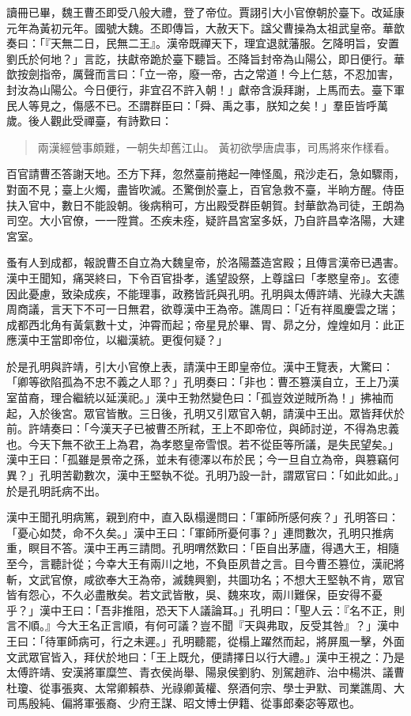 讀冊已畢，魏王曹丕即受八般大禮，登了帝位。賈詡引大小官僚朝於臺下。改延康元年為黃初元年。國號大魏。丕即傳旨，大赦天下。諡父曹操為太祖武皇帝。華歆奏曰：「『天無二日，民無二王』。漢帝既禪天下，理宜退就藩服。乞降明旨，安置劉氏於何地？」言訖，扶獻帝跪於臺下聽旨。丕降旨封帝為山陽公，即日便行。華歆按劍指帝，厲聲而言曰：「立一帝，廢一帝，古之常道！今上仁慈，不忍加害，封汝為山陽公。今日便行，非宜召不許入朝！」獻帝含淚拜謝，上馬而去。臺下軍民人等見之，傷感不已。丕謂群臣曰：「舜、禹之事，朕知之矣！」羣臣皆呼萬歲。後人觀此受禪臺，有詩歎曰：

\begin{quote}
兩漢經營事頗難，一朝失却舊江山。
黃初欲學唐虞事，司馬將來作樣看。
\end{quote}

百官請曹丕答謝天地。丕方下拜，忽然臺前捲起一陣怪風，飛沙走石，急如驟雨，對面不見；臺上火燭，盡皆吹滅。丕驚倒於臺上，百官急救不臺，半晌方醒。侍臣扶入官中，數日不能設朝。後病稍可，方出殿受群臣朝賀。封華歆為司徒，王朗為司空。大小官僚，一一陞賞。丕疾未痊，疑許昌宮室多妖，乃自許昌幸洛陽，大建宮室。

蚤有人到成都，報說曹丕自立為大魏皇帝，於洛陽蓋造宮殿；且傳言漢帝已遇害。漢中王聞知，痛哭終曰，下令百官掛孝，遙望設祭，上尊諡曰「孝愍皇帝」。玄德因此憂慮，致染成疾，不能理事，政務皆託與孔明。孔明與太傅許靖、光祿大夫譙周商議，言天下不可一日無君，欲尊漢中王為帝。譙周曰：「近有祥風慶雲之瑞；成都西北角有黃氣數十丈，沖霄而起；帝星見於畢、胃、昴之分，煌煌如月：此正應漢中王當即帝位，以繼漢統。更復何疑？」

於是孔明與許靖，引大小官僚上表，請漢中王即皇帝位。漢中王覽表，大驚曰：「卿等欲陷孤為不忠不義之人耶？」孔明奏曰：「非也：曹丕篡漢自立，王上乃漢室苗裔，理合繼統以延漢祀。」漢中王勃然變色曰：「孤豈效逆賊所為！」拂袖而起，入於後宮。眾官皆散。三日後，孔明又引眾官入朝，請漢中王出。眾皆拜伏於前。許靖奏曰：「今漢天子已被曹丕所弒，王上不即帝位，與師討逆，不得為忠義也。今天下無不欲王上為君，為孝愍皇帝雪恨。若不從臣等所議，是失民望矣。」漢中王曰：「孤雖是景帝之孫，並未有德澤以布於民；今一旦自立為帝，與篡竊何異？」孔明苦勸數次，漢中王堅執不從。孔明乃設一計，謂眾官曰：「如此如此。」於是孔明託病不出。

漢中王聞孔明病篤，親到府中，直入臥榻邊問曰：「軍師所感何疾？」孔明答曰：「憂心如焚，命不久矣。」漢中王曰：「軍師所憂何事？」連問數次，孔明只推病重，瞑目不答。漢中王再三請問。孔明喟然歎曰：「臣自出茅廬，得遇大王，相隨至今，言聽計從；今幸大王有兩川之地，不負臣夙昔之言。目今曹丕篡位，漢祀將斬，文武官僚，咸欲奉大王為帝，滅魏興劉，共圖功名；不想大王堅執不肯，眾官皆有怨心，不久必盡散矣。若文武皆散，吳、魏來攻，兩川難保，臣安得不憂乎？」漢中王曰：「吾非推阻，恐天下人議論耳。」孔明曰：「聖人云：『名不正，則言不順。』今大王名正言順，有何可議？豈不聞『天與弗取，反受其咎』？」漢中王曰：「待軍師病可，行之未遲。」孔明聽罷，從榻上躍然而起，將屏風一擊，外面文武眾官皆入，拜伏於地曰：「王上既允，便請擇日以行大禮。」漢中王視之：乃是太傅許靖、安漢將軍糜竺、青衣侯尚舉、陽泉侯劉豹、別駕趙祚、治中楊洪、議曹杜瓊、從事張爽、太常卿賴恭、光祿卿黃權、祭酒何宗、學士尹默、司業譙周、大司馬殷純、偏將軍張裔、少府王謀、昭文博士伊籍、從事郎秦宓等眾也。

